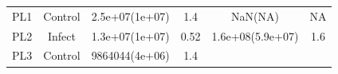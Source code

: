 \documentclass[]{article}
\begin{document}
\begin{longtable}[]{@{}cccccc@{}}
\begin{minipage}[t]{0.12\columnwidth}\centering\strut
PL1\strut
\end{minipage} & \begin{minipage}[t]{0.12\columnwidth}\centering\strut
Control\strut
\end{minipage} & \begin{minipage}[t]{0.16\columnwidth}\centering\strut
2.5e+07(1e+07)\strut
\end{minipage} & \begin{minipage}[t]{0.16\columnwidth}\centering\strut
1.4\strut
\end{minipage} & \begin{minipage}[t]{0.17\columnwidth}\centering\strut
NaN(NA)\strut
\end{minipage} & \begin{minipage}[t]{0.12\columnwidth}\centering\strut
NA\strut
\end{minipage}\tabularnewline
\begin{minipage}[t]{0.12\columnwidth}\centering\strut
PL2\strut
\end{minipage} & \begin{minipage}[t]{0.12\columnwidth}\centering\strut
Infect\strut
\end{minipage} & \begin{minipage}[t]{0.16\columnwidth}\centering\strut
1.3e+07(1e+07)\strut
\end{minipage} & \begin{minipage}[t]{0.16\columnwidth}\centering\strut
0.52\strut
\end{minipage} & \begin{minipage}[t]{0.17\columnwidth}\centering\strut
1.6e+08(5.9e+07)\strut
\end{minipage} & \begin{minipage}[t]{0.12\columnwidth}\centering\strut
1.6\strut
\end{minipage}\tabularnewline
\begin{minipage}[t]{0.12\columnwidth}\centering\strut
PL3\strut
\end{minipage} & \begin{minipage}[t]{0.12\columnwidth}\centering\strut
Control\strut
\end{minipage} & \begin{minipage}[t]{0.16\columnwidth}\centering\strut
9864044(4e+06)\strut
\end{minipage} & \begin{minipage}[t]{0.16\columnwidth}\centering\strut
1.4\strut

\end{minipage}
\end{longtable}
\end{document}

